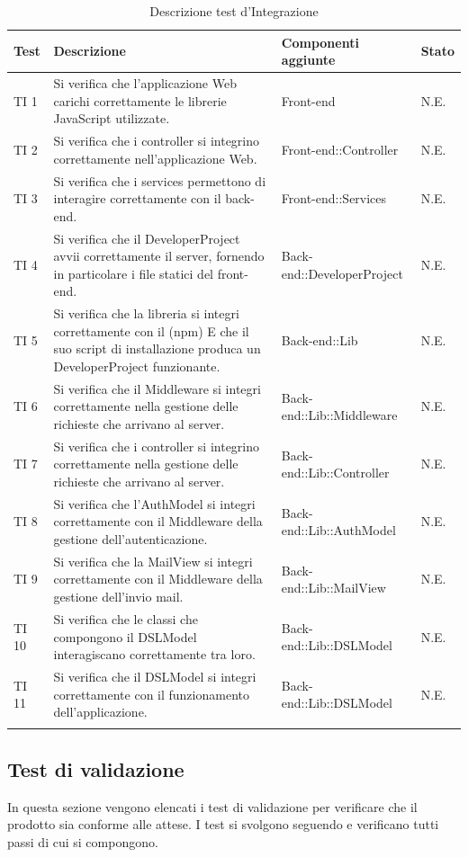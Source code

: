 	\bgroup
	\begin{longtable}[H]{|P{1cm}|P{5cm}|P{4.5cm}|P{2cm}|}
		\hline \textbf{Test} & \textbf{Descrizione} & \textbf{Componenti aggiunte} & \textbf{Stato} \\
		
		\hline TI 1 & Si verifica che l'applicazione Web carichi correttamente le librerie JavaScript utilizzate. & Front-end & N.E. \\
		\hline TI 2 & Si verifica che i controller si integrino correttamente nell'applicazione Web. & Front-end::Controller & N.E. \\
		\hline TI 3 & Si verifica che i services permettono di interagire correttamente con il back-end. & Front-end::Services & N.E. \\
		\hline TI 4 & Si verifica che il DeveloperProject avvii correttamente il server, fornendo in particolare i file statici del front-end. & Back-end::DeveloperProject & N.E. \\
		\hline TI 5 & Si verifica che la libreria si integri correttamente con il  (npm) E che il suo script di installazione produca un DeveloperProject funzionante. & Back-end::Lib & N.E. \\
		\hline TI 6 & Si verifica che il Middleware si integri correttamente nella gestione delle richieste che arrivano al server. & Back-end::Lib::Middleware & N.E. \\
		\hline TI 7 & Si verifica che i controller si integrino correttamente nella gestione delle richieste che arrivano al server. & Back-end::Lib::Controller & N.E. \\
		\hline TI 8 & Si verifica che l'AuthModel si integri correttamente con il Middleware della gestione dell'autenticazione. & Back-end::Lib::AuthModel & N.E. \\
		\hline TI 9 & Si verifica che la MailView si integri correttamente con il Middleware della gestione dell'invio mail. & Back-end::Lib::MailView & N.E. \\
		\hline TI 10 & Si verifica che le classi che compongono il DSLModel interagiscano correttamente tra loro. & Back-end::Lib::DSLModel & N.E. \\
		\hline TI 11 & Si verifica che il DSLModel si integri correttamente con il funzionamento dell'applicazione. & Back-end::Lib::DSLModel & N.E. \\
		\hline
	\caption{Descrizione test d'Integrazione}
	\end{longtable}
	\egroup

	\subsection{Test di validazione}
	In questa sezione vengono elencati i test di validazione per verificare che il prodotto sia conforme alle attese. I test si svolgono seguendo e verificano tutti passi di cui si compongono.
	
	
	
	
	

